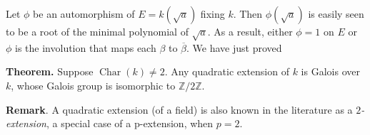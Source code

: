 \documentclass[12pt]{article}
\begin{document}
Let $\phi$ be an automorphism of $E=k(\sqrt{a})$ fixing $k$.  Then $\phi(\sqrt{a})$ is easily seen to be a root of the minimal polynomial of $\sqrt{a}$.  As a result, either $\phi=1$ on $E$ or $\phi$ is the involution that maps each $\beta$ to $\overline{\beta}$.  We have just proved

\textbf{Theorem.}  Suppose $\operatorname{Char}(k)\neq 2$.  Any quadratic extension of $k$ is Galois over $k$, whose Galois group is isomorphic to $\mathbb{Z}/2\mathbb{Z}$.

\textbf{Remark}.  A quadratic extension (of a field) is also known in the literature as a \emph{$2$-extension}, a special case of a p-extension, when $p=2$.
\end{document}
